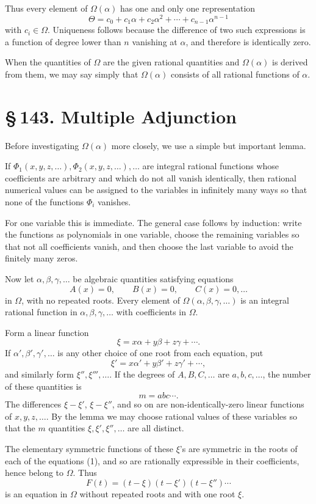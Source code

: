 \documentclass[11pt]{article}
\providecommand{\sect}[2]{\section*{\S\,#1. #2}}
\begin{document}
Thus every element of $\Omega(\alpha)$ has one and only one representation
\[
        \Theta=c_0+c_1\alpha+c_2\alpha^2+\cdots+c_{n-1}\alpha^{n-1}
\]
with $c_i\in\Omega$. Uniqueness follows because the difference of two such expressions is a function of degree lower than $n$ vanishing at $\alpha$, and therefore is identically zero.

When the quantities of $\Omega$ are the given rational quantities and $\Omega(\alpha)$ is derived from them, we may say simply that $\Omega(\alpha)$ consists of all rational functions of $\alpha$.

\sect{143}{Multiple Adjunction}

Before investigating $\Omega(\alpha)$ more closely, we use a simple but important lemma.

If $\Phi_1(x,y,z,\ldots),\Phi_2(x,y,z,\ldots),\ldots$ are integral rational functions whose coefficients are arbitrary and which do not all vanish identically, then rational numerical values can be assigned to the variables in infinitely many ways so that none of the functions $\Phi_i$ vanishes.

For one variable this is immediate. The general case follows by induction: write the functions as polynomials in one variable, choose the remaining variables so that not all coefficients vanish, and then choose the last variable to avoid the finitely many zeros.

Now let $\alpha,\beta,\gamma,\ldots$ be algebraic quantities satisfying equations
\[
\tag{1}
        A(x)=0,\qquad B(x)=0,\qquad C(x)=0,\ldots
\]
in $\Omega$, with no repeated roots. Every element of $\Omega(\alpha,\beta,\gamma,\ldots)$ is an integral rational function in $\alpha,\beta,\gamma,\ldots$ with coefficients in $\Omega$.

Form a linear function
\[
        \xi=x\alpha+y\beta+z\gamma+\cdots.
\]
If $\alpha',\beta',\gamma',\ldots$ is any other choice of one root from each equation, put
\[
        \xi'=x\alpha'+y\beta'+z\gamma'+\cdots,
\]
and similarly form $\xi'',\xi''',\ldots$. If the degrees of $A,B,C,\ldots$ are $a,b,c,\ldots$, the number of these quantities is
\[
        m=abc\cdots.
\]
The differences $\xi-\xi'$, $\xi-\xi''$, and so on are non-identically-zero linear functions of $x,y,z,\ldots$. By the lemma we may choose rational values of these variables so that the $m$ quantities $\xi,\xi',\xi'',\ldots$ are all distinct.

The elementary symmetric functions of these $\xi$'s are symmetric in the roots of each of the equations (1), and so are rationally expressible in their coefficients, hence belong to $\Omega$. Thus
\[
\tag{2}
        F(t)=(t-\xi)(t-\xi')(t-\xi'')\cdots
\]
is an equation in $\Omega$ without repeated roots and with one root $\xi$.
\end{document}
